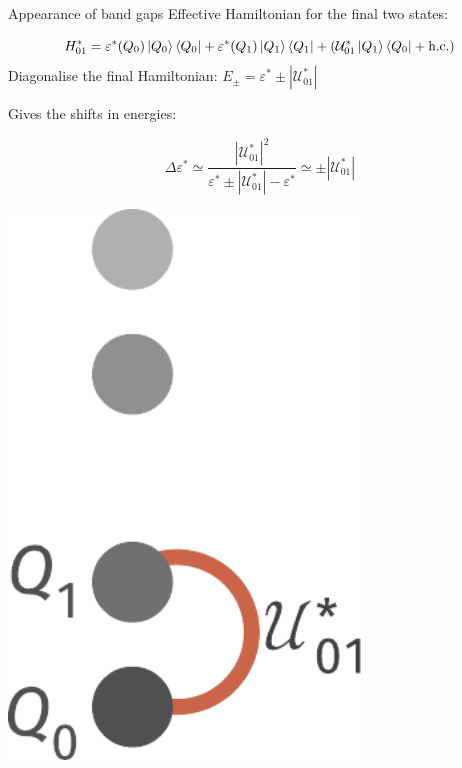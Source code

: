 \documentclass[aspectratio=169,t]{beamer}
\begin{document}
\begin{frame}{Appearance of band gaps}
	\alert{Effective Hamiltonian} for the final two states:
	\begin{minipage}{0.7\textwidth}
	\[H_{01}^* = \varepsilon^*(Q_0)\ket{Q_0}\bra{Q_0} + \varepsilon^{*}(Q_1)\ket{Q_1}\bra{Q_1} + \left(\mathcal{U}_{01}^{*}\ket{Q_1}\bra{Q_0} + \text{h.c.}\right)\]
	Diagonalise the final Hamiltonian: \(E_\pm = \varepsilon^* \pm |\mathcal{U}_{01}^*|\)\\
	\begin{minipage}{0.5\textwidth}
	Gives the \alert{shifts in energies}: 
	\end{minipage}
	\begin{minipage}{0.45\textwidth}
	\[\Delta \varepsilon^* \simeq \frac{|\mathcal{U}_{01}^*|^2}{\varepsilon^* \pm |\mathcal{U}_{01}^*| - \varepsilon^*} \simeq \pm |\mathcal{U}_{01}^*|\]
	\end{minipage}
	\end{minipage}
	\hspace*{\fill}
	\begin{minipage}{0.2\textwidth}
	\includegraphics[width=0.7\textwidth]{effham10.pdf}
	\end{minipage}


\end{frame}
\end{document}

